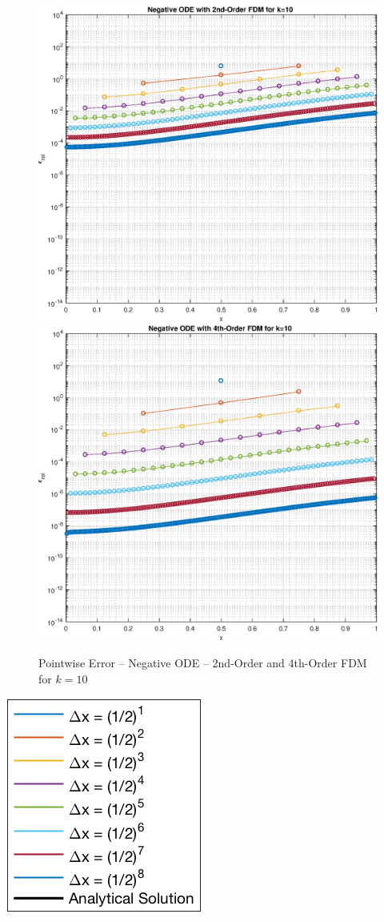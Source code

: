 \documentclass[10pt, reqno]{article}		%
\numberwithin{equation}{section}
\begin{document}
\begin{figure}[H]
	\begin{center}
		\includegraphics[width = 0.49\linewidth]{error_negative_ode_order_2_k_10}
		\includegraphics[width = 0.49\linewidth]{error_negative_ode_order_4_k_10}
		\caption{Pointwise Error -- Negative ODE -- 2nd-Order and 4th-Order FDM for $k = 10$}
	\end{center}
\end{figure}

\begin{center}
	\includegraphics[height = 0.25\linewidth]{legend}
\end{center}

\newpage
\end{document}

